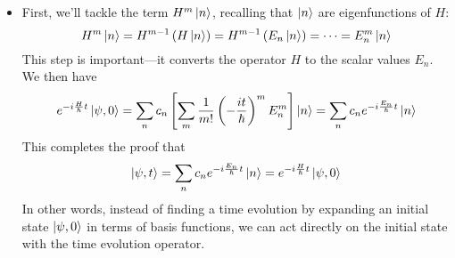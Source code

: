 \documentclass[11pt, a4paper]{article}
\begin{document}
\begin{itemize}
	\item First, we'll tackle the term $ H^{m}\ket{n} $, recalling that $ \ket{n} $ are eigenfunctions of $ H $:
	\begin{equation*}
		H^{m}\ket{n} = H^{m-1}\left(H\ket{n}\right) = H^{m-1}\left(E_{n}\ket{n}\right) = \cdots = E_{n}^{m}\ket{n}
	\end{equation*}
	This step is important---it converts the operator $ H $ to the scalar values $ E_{n} $. We then have
	\begin{equation*}
		e^{-i\frac{H}{\hbar}t}\ket{\psi, 0} = \sum_{n}c_{n} \left[\sum_{m}\frac{1}{m!}\left (-\frac{it}{\hbar}\right )^{m}E_{n}^{m}\right]\ket{n} = \sum_{n}c_{n}e^{-i\frac{E_{n}}{\hbar}t}\ket{n}
	\end{equation*}
	This completes the proof that
	\begin{equation*}
		\ket{\psi, t} = \sum_{n} c_{n}e^{-i \frac{E_{n}}{\hbar}t}\ket{n} = e^{-i\frac{H}{\hbar}t}\ket{\psi, 0}
	\end{equation*} 
	In other words, instead of finding a time evolution by expanding an initial state $ \ket{\psi, 0} $ in terms of basis functions, we can act directly on the initial state with the time evolution operator.
\end{itemize}
\end{document}

